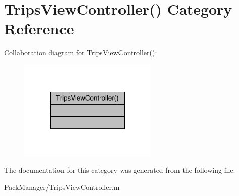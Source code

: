 \hypertarget{category_trips_view_controller_07_08}{\section{Trips\-View\-Controller() Category Reference}
\label{category_trips_view_controller_07_08}
}


Collaboration diagram for Trips\-View\-Controller()\-:\nopagebreak
\begin{figure}[H]
\begin{center}
\leavevmode
\includegraphics[width=188pt]{category_trips_view_controller_07_08__coll__graph}
\end{center}
\end{figure}


The documentation for this category was generated from the following file\-:\begin{DoxyCompactItemize}
\item 
Pack\-Manager/Trips\-View\-Controller.\-m\end{DoxyCompactItemize}
